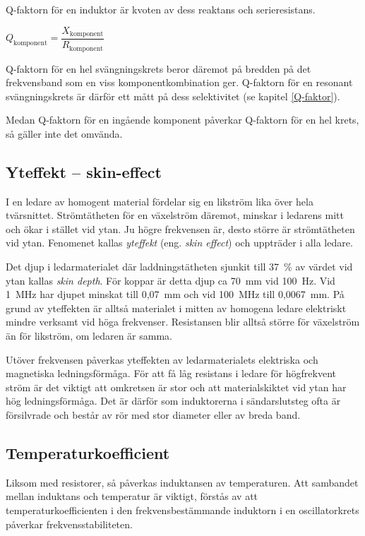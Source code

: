 Q-faktorn för en induktor är kvoten av dess reaktans och serieresistans.

\(Q_\text{komponent} = \dfrac{X_\text{komponent}}{R_\text{komponent}}\)

Q-faktorn för en hel svängningskrets beror däremot på bredden på det
frekvensband som en viss komponentkombination ger.
Q-faktorn för en resonant svängningskrets är därför ett mått på dess
selektivitet (se kapitel \ref{Q-faktor}).

Medan Q-faktorn för en ingående komponent påverkar Q-faktorn för en hel krets,
så gäller inte det omvända.

\subsection{Yteffekt -- skin-effect}

I en ledare av homogent material fördelar sig en likström lika över hela
tvärsnittet. Strömtätheten för en växelström däremot, minskar i ledarens mitt
och ökar i stället vid ytan.
Ju högre frekvensen är, desto större är strömtätheten vid ytan.
Fenomenet kallas \emph{yteffekt} (eng. \emph{skin effect}) och uppträder i alla
ledare.

Det djup i ledarmaterialet där laddningstätheten sjunkit till 37~\% av
värdet vid ytan kallas \emph{skin depth}. För koppar är detta djup ca 70~mm vid
100~Hz. Vid 1~MHz har djupet minskat till 0,07~mm och vid 100~MHz till
0,0067~mm. På grund av yteffekten är alltså materialet i mitten av homogena
ledare elektriskt mindre verksamt vid höga frekvenser. Resistansen blir alltså
större för växelström än för likström, om ledaren är samma.

Utöver frekvensen påverkas yteffekten av ledarmaterialets elektriska och
magnetiska ledningsförmåga. För att få låg resistans i ledare för högfrekvent
ström är det viktigt att omkretsen är stor och att materialskiktet vid ytan har
hög ledningsförmåga. Det är därför som induktorerna i sändarslutsteg ofta är
försilvrade och består av rör med stor diameter eller av breda band.

\subsection{Temperaturkoefficient}

Liksom med resistorer, så påverkas induktansen av temperaturen. Att sambandet
mellan induktans och temperatur är viktigt, förstås av att
temperaturkoefficienten i den frekvensbestämmande induktorn i en oscillatorkrets
påverkar frekvensstabiliteten.


